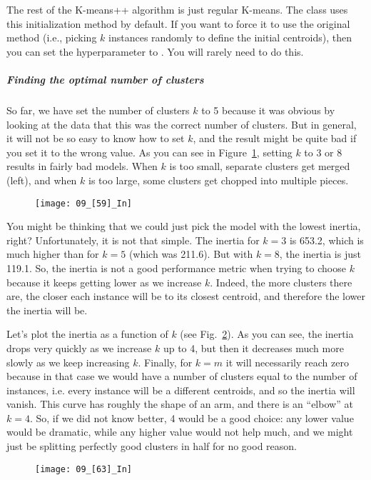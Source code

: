 The rest of the K-means++ algorithm is just regular K-means. The  class uses this initialization method by default. If you want to force it to use the original method (i.e., picking $k$ instances randomly to define the initial centroids), then you can set the  hyperparameter to . You will rarely need to do this.
\subparagraph{Finding the optimal number of clusters}
So far, we have set the number of clusters $k$ to 5 because it was obvious by looking at the data that this was the correct number of clusters. But in general, it will not be so easy to know how to set $k$, and the result might be quite bad if you set it to the wrong value. As you can see in Figure~\ref{09_[59]_In}, setting $k$ to 3 or 8 results in fairly bad models. When $k$ is too small, separate clusters get merged (left), and when $k$ is too large, some clusters get chopped into multiple pieces.
\begin{figure}[h!t]
\centering
\texttt{[image: 09\_[59]\_In]}
\caption{}\label{09_[59]_In}
\end{figure}

You might be thinking that we could just pick the model with the lowest inertia, right? Unfortunately, it is not that simple. The inertia for $k=3$ is \num{653.2}, which is much higher than for $k=5$ (which was \num{211.6}). But with $k=8$, the inertia is just \num{119.1}. So, the inertia is not a good performance metric when trying to choose $k$ because it keeps getting lower as we increase $k$. Indeed, the more clusters there are, the closer each instance will be to its closest centroid, and therefore the lower the inertia will be.

Let's plot the inertia as a function of $k$ (see Fig.~\ref{09_[63]_In}). As you can see, the inertia drops very quickly as we increase $k$ up to 4, but then it decreases much more slowly as we keep increasing $k$. Finally, for $k=m$ it will necessarily reach zero because in that case we would have a number of clusters equal to the number of instances, i.e. every instance will be a different centroids, and so the inertia will vanish. This curve has roughly the shape of an arm, and there is an ``elbow'' at $k=4$. So, if we did not know better, 4 would be a good choice: any lower value would be dramatic, while any higher value would not help much, and we might just be splitting perfectly good clusters in half for no good reason.
\begin{figure}[h!t]
\centering
\texttt{[image: 09\_[63]\_In]}
\caption{}\label{09_[63]_In}
\end{figure}

